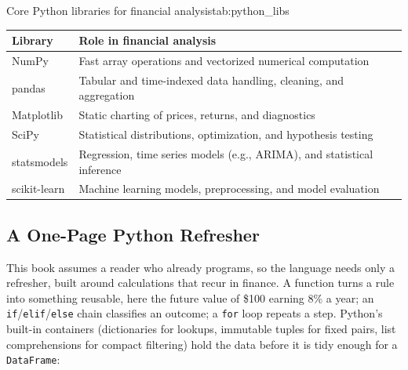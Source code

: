 \documentclass[../ai_in_finance]{subfiles}
\begin{document}
\begin{booktable}[htbp]{Core Python libraries for financial analysis}{tab:python_libs}
\begin{tabular}{L{2.6cm}L{9.5cm}}
\toprule
Library & Role in financial analysis \\
\midrule
NumPy & Fast array operations and vectorized numerical computation \\
pandas & Tabular and time-indexed data handling, cleaning, and aggregation \\
Matplotlib & Static charting of prices, returns, and diagnostics \\
SciPy & Statistical distributions, optimization, and hypothesis testing \\
statsmodels & Regression, time series models (e.g., ARIMA), and statistical inference \\
scikit-learn & Machine learning models, preprocessing, and model evaluation \\
\bottomrule
\end{tabular}
\end{booktable}

\subsection{A One-Page Python Refresher}
\label{sec:first-session}\label{sec:python-control-flow}

This book assumes a reader who already programs, so the language needs only a refresher, built around calculations that recur in finance. A function turns a rule into something reusable, here the future value of \$100 earning 8\% a year; an \texttt{if}/\texttt{elif}/\texttt{else} chain classifies an outcome; a \texttt{for} loop repeats a step. Python's built-in containers (dictionaries for lookups, immutable tuples for fixed pairs, list comprehensions for compact filtering) hold the data before it is tidy enough for a \texttt{DataFrame}:
\end{document}
